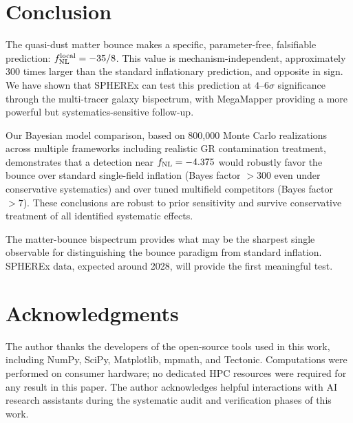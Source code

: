 \documentclass[a4paper,11pt]{article}
\newcommand{\fnl}{f_{\rm NL}}
\begin{document}
\section{Conclusion}
\label{sec:conclusion}

The quasi-dust matter bounce makes a specific, parameter-free, falsifiable prediction: $\fnl^{\rm local} = -35/8$. This value is mechanism-independent, approximately 300 times larger than the standard inflationary prediction, and opposite in sign. We have shown that SPHEREx can test this prediction at $4$--$6\sigma$ significance through the multi-tracer galaxy bispectrum, with MegaMapper providing a more powerful but systematics-sensitive follow-up.

Our Bayesian model comparison, based on 800{,}000 Monte Carlo realizations across multiple frameworks including realistic GR contamination treatment, demonstrates that a detection near $\fnl = -4.375$ would robustly favor the bounce over standard single-field inflation (Bayes factor $> 300$ even under conservative systematics) and over tuned multifield competitors (Bayes factor $> 7$). These conclusions are robust to prior sensitivity and survive conservative treatment of all identified systematic effects.

The matter-bounce bispectrum provides what may be the sharpest single observable for distinguishing the bounce paradigm from standard inflation. SPHEREx data, expected around 2028, will provide the first meaningful test.

\section*{Acknowledgments}

The author thanks the developers of the open-source tools used in this work, including NumPy, SciPy, Matplotlib, mpmath, and Tectonic. Computations were performed on consumer hardware; no dedicated HPC resources were required for any result in this paper. The author acknowledges helpful interactions with AI research assistants during the systematic audit and verification phases of this work.


\end{document}

